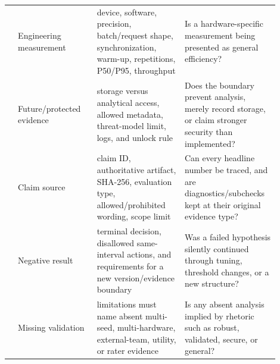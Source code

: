 \begin{table}[htbp]
\begin{tabular}{>{\raggedright\arraybackslash}p{0.035\linewidth}>{\raggedright\arraybackslash}p{0.27\linewidth}>{\raggedright\arraybackslash}p{0.30\linewidth}>{\raggedright\arraybackslash}p{0.29\linewidth}}
10 & Engineering measurement & device, software, precision, batch/request shape, synchronization, warm-up, repetitions, P50/P95, throughput & Is a hardware-specific measurement being presented as general efficiency? \\
11 & Future/protected evidence & storage versus analytical access, allowed metadata, threat-model limit, logs, and unlock rule & Does the boundary prevent analysis, merely record storage, or claim stronger security than implemented? \\
12 & Claim source & claim ID, authoritative artifact, SHA-256, evaluation type, allowed/prohibited wording, scope limit & Can every headline number be traced, and are diagnostics/subchecks kept at their original evidence type? \\
13 & Negative result & terminal decision, disallowed same-interval actions, and requirements for a new version/evidence boundary & Was a failed hypothesis silently continued through tuning, threshold changes, or a new structure? \\
14 & Missing validation & limitations must name absent multi-seed, multi-hardware, external-team, utility, or rater evidence & Is any absent analysis implied by rhetoric such as robust, validated, secure, or general? \\
\bottomrule
\end{tabular}
\end{table}
